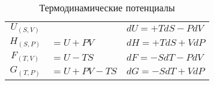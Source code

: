 \begin{table}[h]
\caption{Термодинамические потенциалы}
    \centering
    \begin{tabular}{c|ll}
    \toprule
        $U_{(S, V)}$ &                   & $dU = +TdS - PdV$      \\
        $H_{(S, P)}$ & $= U + PV$        & $dH = +TdS + VdP$      \\
        $F_{(T, V)}$ & $= U - TS$        & $dF = -SdT - PdV$      \\
        $G_{(T, P)}$ & $= U + PV - TS$   & $dG = -SdT + VdP$      \\
    \bottomrule
    \end{tabular}
    \label{tab1}
\end{table}